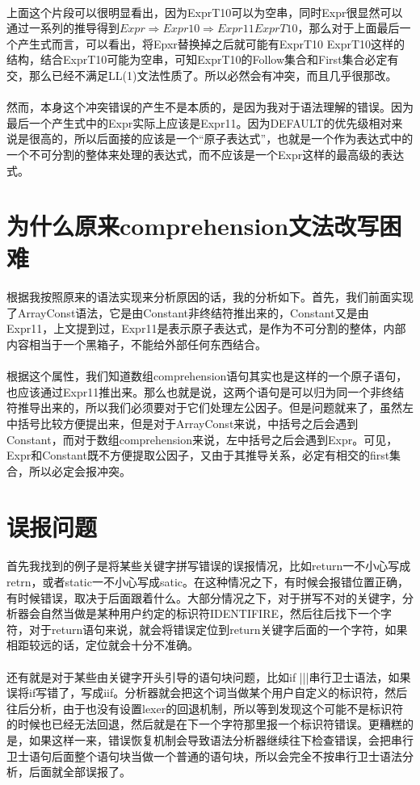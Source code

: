\documentclass[UTF8]{ctexart}
\begin{document}
\paragraph{}上面这个片段可以很明显看出，因为ExprT10可以为空串，同时Expr很显然可以通过一系列的推导得到$Expr\Rightarrow Expr10\Rightarrow Expr11 ExprT10$，那么对于上面最后一个产生式而言，可以看出，将Epxr替换掉之后就可能有ExprT10 ExprT10这样的结构，结合ExprT10可能为空串，可知ExprT10的Follow集合和First集合必定有交，那么已经不满足LL(1)文法性质了。所以必然会有冲突，而且几乎很那改。
\paragraph{}然而，本身这个冲突错误的产生不是本质的，是因为我对于语法理解的错误。因为最后一个产生式中的Expr实际上应该是Expr11。因为DEFAULT的优先级相对来说是很高的，所以后面接的应该是一个“原子表达式”，也就是一个作为表达式中的一个不可分割的整体来处理的表达式，而不应该是一个Expr这样的最高级的表达式。
\section{为什么原来comprehension文法改写困难}
\paragraph{}根据我按照原来的语法实现来分析原因的话，我的分析如下。首先，我们前面实现了ArrayConst语法，它是由Constant非终结符推出来的，Constant又是由Expr11，上文提到过，Expr11是表示原子表达式，是作为不可分割的整体，内部内容相当于一个黑箱子，不能给外部任何东西结合。
\paragraph{}根据这个属性，我们知道数组comprehension语句其实也是这样的一个原子语句，也应该通过Expr11推出来。那么也就是说，这两个语句是可以归为同一个非终结符推导出来的，所以我们必须要对于它们处理左公因子。但是问题就来了，虽然左中括号比较方便提出来，但是对于ArrayConst来说，中括号之后会遇到Constant，而对于数组comprehension来说，左中括号之后会遇到Expr。可见，Expr和Constant既不方便提取公因子，又由于其推导关系，必定有相交的first集合，所以必定会报冲突。
\section{误报问题}
\paragraph{}首先我找到的例子是将某些关键字拼写错误的误报情况，比如return一不小心写成retrn，或者static一不小心写成satic。在这种情况之下，有时候会报错位置正确，有时候错误，取决于后面跟着什么。大部分情况之下，对于拼写不对的关键字，分析器会自然当做是某种用户约定的标识符IDENTIFIRE，然后往后找下一个字符，对于return语句来说，就会将错误定位到return关键字后面的一个字符，如果相距较远的话，定位就会十分不准确。
\paragraph{}还有就是对于某些由关键字开头引导的语句块问题，比如if {|||}串行卫士语法，如果误将if写错了，写成iif。分析器就会把这个词当做某个用户自定义的标识符，然后往后分析，由于也没有设置lexer的回退机制，所以等到发现这个可能不是标识符的时候也已经无法回退，然后就是在下一个字符那里报一个标识符错误。更糟糕的是，如果这样一来，错误恢复机制会导致语法分析器继续往下检查错误，会把串行卫士语句后面整个语句块当做一个普通的语句块，所以会完全不按串行卫士语法分析，后面就全部误报了。
\end{document}
